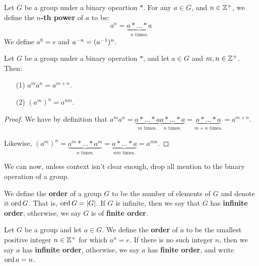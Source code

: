 \begin{definition}
    Let $G$ be a group under a binary opeartion  $\ast$. For any $a \in G$, and
    $n \in \mathbb{Z}^+$, we define the  \textbf{$n$-th power} of $a$ to be:
    \begin{equation*}
        a^n=\underbrace{a \ast \dots \ast a}_{n \text{ times.}}
    \end{equation*}
    We define $a^0=e$ and  $a^{-n}=(a^{-1})^n$.
\end{definition}

\begin{lemma}\label{1.2.4}
    Let $G$ be a group under a binary operation  $\ast$, and let  $a \in G$ and
     $m,n \in \mathbb{Z}^+$. Then:
     \begin{enumerate}
         \item[(1)] $a^ma^n=a^{m+n}$.

         \item[(2)] $(a^m)^n=a^{mn}$.
     \end{enumerate}
\end{lemma}
\begin{proof}
    We have by definition that $a^ma^n=\underbrace{a \ast \dots \ast a}_{m
    \text{ times.}}\underbrace{a \ast \dots \ast a}_{n \text{ times.}}=
    \underbrace{a \ast \dots \ast a}_{m+n \text{ times.}}=a^{m+n}$.

    Likewise, $(a^m)^n=\underbrace{a^m \ast \dots \ast a^m}_{n \text{ times.}}=
    \underbrace{a \ast \dots \ast a}_{nm \text{ times.}}=a^{mn}$.
\end{proof}

We can now, unless context isn't clear enough, drop all mention to the binary
operation of a group.

\begin{definition}
    We define the \textbf{order} of a group $G$ to be the number of elements of
    $G$ and denote it  $\operatorname{ord}{G}$. That is, $\operatorname{ord}{G}=|G|$. If $G$ is infinite,
    then we say that  $G$ has  \textbf{infinite order}; otherwise, we say $G$ is
    of  \textbf{finite order}.
\end{definition}

\begin{definition}
    Let $G$ be a group and let  $a \in G$. We define the \textbf{order} of $a$
    to be the smallest positive integer  $n \in \mathbb{Z}^+$ for which $a^n=e$. If
    there is no such integer $n$, then we say  $a$ has  \textbf{infinite order},
    otherwise, we say $a$ has \textbf{finite order}, and write $\operatorname{ord}{a}=n$.
\end{definition}

